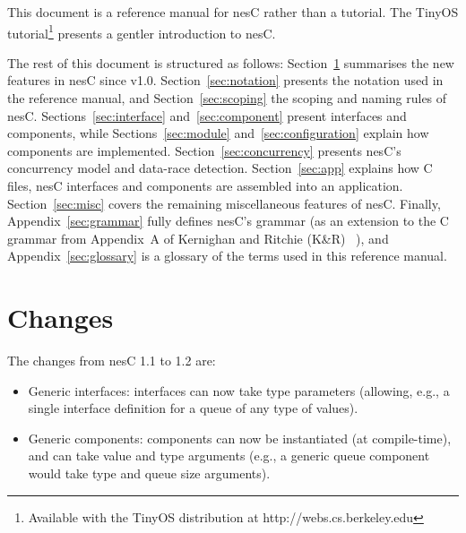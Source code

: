 \documentclass[11pt,letterpaper]{article}
\newcommand{\nesc}{nesC\xspace}
\newcommand{\tinyos}{TinyOS\xspace}
\begin{document}
This document is a reference manual for \nesc rather than a tutorial. The
\tinyos tutorial\footnote{Available with the \tinyos distribution at
http://webs.cs.berkeley.edu} presents a gentler introduction to \nesc.

The rest of this document is structured as follows:
Section~\ref{sec:changes} summarises the new features in \nesc since v1.0.
Section~\ref{sec:notation} presents the notation used in the reference
manual, and Section~\ref{sec:scoping} the scoping and naming rules of
\nesc. Sections~\ref{sec:interface} and~\ref{sec:component} present
interfaces and components, while Sections~\ref{sec:module}
and~\ref{sec:configuration} explain how components are
implemented. Section~\ref{sec:concurrency} presents \nesc's concurrency
model and data-race detection. Section~\ref{sec:app} explains how C files,
\nesc interfaces and components are assembled into an
application. Section~\ref{sec:misc} covers the remaining miscellaneous
features of \nesc. Finally, Appendix~\ref{sec:grammar} fully defines
\nesc's grammar (as an extension to the C grammar from Appendix~A of
Kernighan and Ritchie (K\&R) ~\cite[pp234--239]{kandr}), and
Appendix~\ref{sec:glossary} is a glossary of the terms used in this
reference manual.

\section{Changes}
\label{sec:changes}

The changes from \nesc 1.1 to 1.2 are:
\begin{itemize}
\item Generic interfaces: interfaces can now take type parameters
(allowing, e.g., a single interface definition for a queue of any type of
values).

\item Generic components: components can now be instantiated (at
compile-time), and can take value and type arguments (e.g., a generic queue
component would take type and queue size arguments).
\end{itemize}
\end{document}

